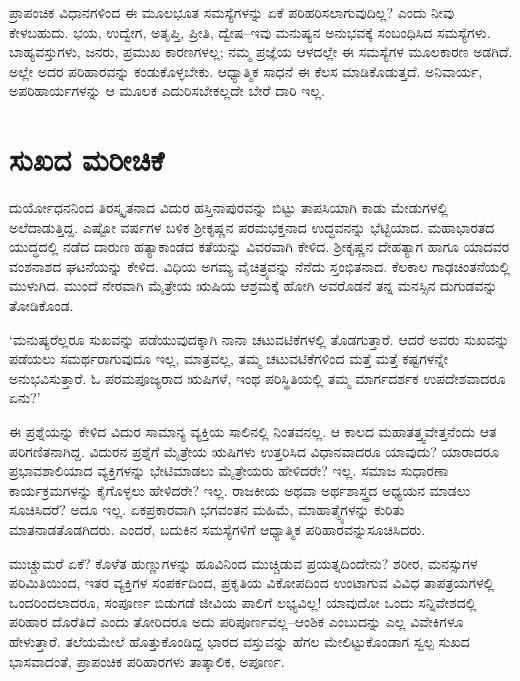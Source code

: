 ಪ್ರಾಪಂಚಿಕ ವಿಧಾನಗಳಿಂದ ಈ ಮೂಲಭೂತ ಸಮಸ್ಯೆಗಳನ್ನು ಏಕೆ ಪರಿಹರಿಸಲಾಗುವುದಿಲ್ಲ? ಎಂದು ನೀವು ಕೇಳಬಹುದು. ಭಯ, ಉದ್ವೇಗ, ಅತೃಪ್ತಿ, ಪ್ರೀತಿ, ದ್ವೇಷ–ಇವು ಮನುಷ್ಯನ ಅನುಭವಕ್ಕೆ ಸಂಬಂಧಿಸಿದ ಸಮಸ್ಯೆಗಳು. ಬಾಹ್ಯವಸ್ತುಗಳು, ಜನರು, ಪ್ರಮುಖ ಕಾರಣಗಳಲ್ಲ; ನಮ್ಮ ಪ್ರಜ್ಞೆಯ ಆಳದಲ್ಲೇ ಈ ಸಮಸ್ಯೆಗಳ ಮೂಲಕಾರಣ ಅಡಗಿದೆ. ಅಲ್ಲೇ ಅದರ ಪರಿಹಾರವನ್ನು ಕಂಡುಕೊಳ್ಳಬೇಕು. ಆಧ್ಯಾತ್ಮಿಕ ಸಾಧನೆ ಈ ಕೆಲಸ ಮಾಡಿಕೊಡುತ್ತದೆ. ಅನಿವಾರ್ಯ, ಅಪರಿಹಾರ್ಯಗಳನ್ನು ಆ ಮೂಲಕ ಎದುರಿಸಬೇಕಲ್ಲದೇ ಬೇರೆ ದಾರಿ ಇಲ್ಲ.


\section*{ಸುಖದ ಮರೀಚಿಕೆ}


ದುರ್ಯೋಧನನಿಂದ ತಿರಸ್ಕೃತನಾದ ವಿದುರ ಹಸ್ತಿನಾಪುರವನ್ನು ಬಿಟ್ಟು ತಾಪಸಿಯಾಗಿ ಕಾಡು ಮೇಡುಗಳಲ್ಲಿ ಅಲೆದಾಡುತ್ತಿದ್ದ. ಎಷ್ಟೋ ವರ್ಷಗಳ ಬಳಿಕ ಶ‍್ರೀಕೃಷ್ಣನ ಪರಮಭಕ್ತನಾದ ಉದ್ಧವನನ್ನು ಭೆಟ್ಟಿಯಾದ. ಮಹಾಭಾರತದ ಯುದ್ಧದಲ್ಲಿ ನಡೆದ ದಾರುಣ ಹತ್ಯಾಕಾಂಡದ ಕತೆಯನ್ನು ವಿವರವಾಗಿ ಕೇಳಿದ. ಶ‍್ರೀಕೃಷ್ಣನ ದೇಹತ್ಯಾಗ ಹಾಗೂ ಯಾದವರ ವಂಶನಾಶದ ಘಟನೆಯನ್ನು ಕೇಳಿದ. ವಿಧಿಯ ಅಗಮ್ಯ ವೈಚಿತ್ರ್ಯವನ್ನು ನೆನೆದು ಸ್ತಂಭಿತನಾದ. ಕೆಲಕಾಲ ಗಾಢಚಿಂತನೆಯಲ್ಲಿ ಮುಳುಗಿದ. ಮುಂದೆ ನೇರವಾಗಿ ಮೈತ್ರೇಯ ಋಷಿಯ ಆಶ್ರಮಕ್ಕೆ ಹೋಗಿ ಅವರೊಡನೆ ತನ್ನ ಮನಸ್ಸಿನ ದುಗುಡವನ್ನು ತೋಡಿಕೊಂಡ.

\vskip 2pt

‘ಮನುಷ್ಯರೆಲ್ಲರೂ ಸುಖವನ್ನು ಪಡೆಯುವುದಕ್ಕಾಗಿ ನಾನಾ ಚಟುವಟಿಕೆಗಳಲ್ಲಿ ತೊಡಗುತ್ತಾರೆ. ಆದರೆ ಅವರು ಸುಖವನ್ನು ಪಡೆಯಲು ಸಮರ್ಥರಾಗುವುದೂ ಇಲ್ಲ, ಮಾತ್ರವಲ್ಲ, ತಮ್ಮ ಚಟುವಟಿಕೆಗಳಿಂದ ಮತ್ತೆ ಮತ್ತೆ ಕಷ್ಟಗಳನ್ನೇ ಅನುಭವಿಸುತ್ತಾರೆ. ಓ ಪರಮಪೂಜ್ಯರಾದ ಋಷಿಗಳೆ, ಇಂಥ ಪರಿಸ್ಥಿತಿಯಲ್ಲಿ ತಮ್ಮ ಮಾರ್ಗದರ್ಶಕ ಉಪದೇಶವಾದರೂ ಏನು?’

\vskip 2pt

ಈ ಪ್ರಶ್ನೆಯನ್ನು ಕೇಳಿದ ವಿದುರ ಸಾಮಾನ್ಯ ವ್ಯಕ್ತಿಯ ಸಾಲಿನಲ್ಲಿ ನಿಂತವನಲ್ಲ. ಆ ಕಾಲದ ಮಹಾತತ್ತ್ವವೇತ್ತನೆಂದು ಆತ ಪರಿಗಣಿತನಾಗಿದ್ದ. ವಿದುರನ ಪ್ರಶ್ನೆಗೆ ಮೈತ್ರೇಯ ಋಷಿಗಳು ಉತ್ತರಿಸಿದ ವಿಧಾನವಾದರೂ ಯಾವುದು? ಯಾರಾದರೂ ಪ್ರಭಾವಶಾಲಿಯಾದ ವ್ಯಕ್ತಿಗಳನ್ನು ಭೇಟಿಮಾಡಲು ಮೈತ್ರೇಯರು ಹೇಳಿದರೇ? ಇಲ್ಲ. ಸಮಾಜ ಸುಧಾರಣಾ ಕಾರ್ಯಕ್ರಮಗಳನ್ನು ಕೈಗೊಳ್ಳಲು ಹೇಳಿದರೇ? ಇಲ್ಲ. ರಾಜಕೀಯ ಅಥವಾ ಅರ್ಥಶಾಸ್ತ್ರದ ಅಧ್ಯಯನ ಮಾಡಲು ಸೂಚಿಸಿದರೆ? ಅದೂ ಇಲ್ಲ. ಏಕಪ್ರಕಾರವಾಗಿ ಭಗವಂತನ ಮಹಿಮೆ, ಮಾಹಾತ್ಮ್ಯೆಗಳನ್ನು ಕುರಿತು ಮಾತನಾಡತೊಡಗಿದರು. ಎಂದರೆ, ಬದುಕಿನ ಸಮಸ್ಯೆಗಳಿಗೆ ಆಧ್ಯಾತ್ಮಿಕ ಪರಿಹಾರವನ್ನು\break ಸೂಚಿಸಿದರು.

\vskip 2pt

ಮುಚ್ಚುಮರೆ ಏಕೆ? ಕೊಳೆತ ಹುಣ್ಣುಗಳನ್ನು ಹೂವಿನಿಂದ ಮುಚ್ಚಿಡುವ ಪ್ರಯತ್ನದಿಂದೇನು? ಶರೀರ, ಮನಸ್ಸುಗಳ ಪರಿಮಿತಿಯಿಂದ, ಇತರ ವ್ಯಕ್ತಿಗಳ ಸಂಪರ್ಕದಿಂದ, ಪ್ರಕೃತಿಯ ವಿಕೋಪದಿಂದ ಉಂಟಾಗುವ ವಿವಿಧ ತಾಪತ್ರಯಗಳಲ್ಲಿ ಒಂದರಿಂದಲಾದರೂ, ಸಂಪೂರ್ಣ ಬಿಡುಗಡೆ ಜೀವಿಯ ಪಾಲಿಗೆ ಲಭ್ಯವಿಲ್ಲ! ಯಾವುದೋ ಒಂದು ಸನ್ನಿವೇಶದಲ್ಲಿ ಪರಿಹಾರ ದೊರೆತಿದೆ ಎಂದು ತೋರಿದರೂ ಅದು ಪರಿಪೂರ್ಣವಲ್ಲ–ಆಂಶಿಕ ಎಂಬುದನ್ನು ಎಲ್ಲ ವಿವೇಕಿಗಳೂ ಹೇಳುತ್ತಾರೆ. ತಲೆಯಮೇಲೆ ಹೊತ್ತುಕೊಂಡಿದ್ದ ಭಾರದ ವಸ್ತುವನ್ನು ಹೆಗಲ ಮೇಲಿಟ್ಟುಕೊಂಡಾಗ ಸ್ವಲ್ಪ ಸುಖದ ಭಾಸವಾದಂತೆ, ಪ್ರಾಪಂಚಿಕ ಪರಿಹಾರಗಳು ತಾತ್ಕಾಲಿಕ, ಅಪೂರ್ಣ.

